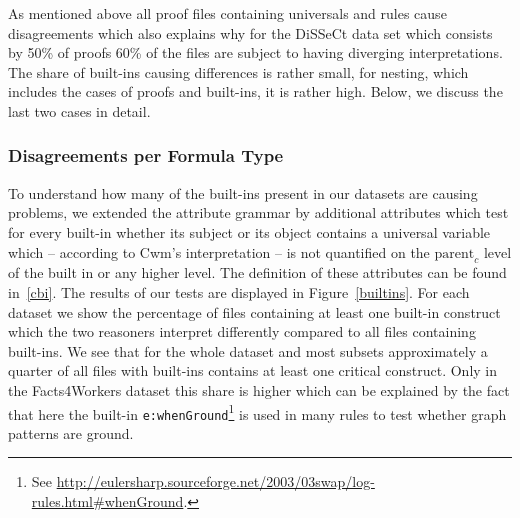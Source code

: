 As mentioned above all proof files containing universals and rules cause disagreements which also explains why for the DiSSeCt data set
which consists by 50\% of proofs 60\% of the files are subject to having diverging interpretations. 
The share of built-ins causing differences is rather small, for nesting, which includes the cases of proofs and built-ins, it is rather high. 
Below, we discuss the last two cases in detail. 




\subsubsection*{Disagreements per Formula Type}
To understand how many of the built-ins present in our datasets are causing problems, 
we extended the attribute grammar by additional attributes which test for every built-in whether its subject or its object contains a universal 
variable which -- according to Cwm's interpretation -- is not 
quantified on the $\text{parent}_c$ level of the built in or any higher level. The definition of these attributes can be found in~\ref{cbi}.
 The results of our tests are displayed in Figure~\ref{builtins}. For each dataset we show the percentage of files containing 
at least one built-in construct 
which the two reasoners interpret differently compared to all files containing built-ins. We see that for the whole dataset and most subsets approximately a quarter of all 
files with built-ins contains at least one critical construct. Only in the Facts4Workers dataset this share is higher which can be explained by
the fact that here the built-in \texttt{e:whenGround}\footnote{See \url{http://eulersharp.sourceforge.net/2003/03swap/log-rules.html\#whenGround}. }
 is used in many rules to test whether graph patterns are ground.

